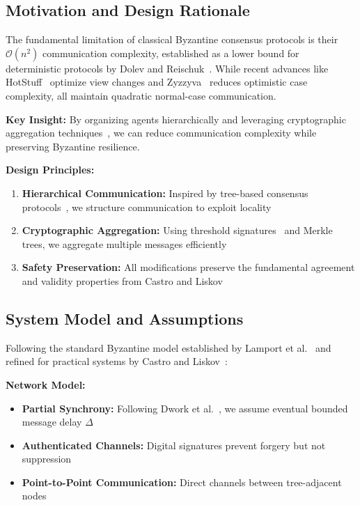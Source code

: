 \documentclass[conference]{IEEEtran}
\newcommand{\bigO}{\mathcal{O}}
\begin{document}
\subsection{Motivation and Design Rationale}

The fundamental limitation of classical Byzantine consensus protocols is their $\bigO(n^2)$ communication complexity, established as a lower bound for deterministic protocols by Dolev and Reischuk~\cite{dolev1985bounds}. While recent advances like HotStuff~\cite{yin2019hotstuff} optimize view changes and Zyzzyva~\cite{kotla2009zyzzyva} reduces optimistic case complexity, all maintain quadratic normal-case communication.

\textbf{Key Insight:} By organizing agents hierarchically and leveraging cryptographic aggregation techniques~\cite{boneh2001short}, we can reduce communication complexity while preserving Byzantine resilience.

\textbf{Design Principles:}
\begin{enumerate}
    \item \textbf{Hierarchical Communication:} Inspired by tree-based consensus protocols~\cite{bracha1987asynchronous}, we structure communication to exploit locality
    \item \textbf{Cryptographic Aggregation:} Using threshold signatures~\cite{boneh2001short} and Merkle trees, we aggregate multiple messages efficiently
    \item \textbf{Safety Preservation:} All modifications preserve the fundamental agreement and validity properties from Castro and Liskov~\cite{castro1999practical}
\end{enumerate}

\subsection{System Model and Assumptions}

Following the standard Byzantine model established by Lamport et al.~\cite{lamport1982byzantine} and refined for practical systems by Castro and Liskov~\cite{castro1999practical}:

\textbf{Network Model:}
\begin{itemize}
    \item \textbf{Partial Synchrony:} Following Dwork et al.~\cite{dwork1988consensus}, we assume eventual bounded message delay $\Delta$
    \item \textbf{Authenticated Channels:} Digital signatures prevent forgery but not suppression
    \item \textbf{Point-to-Point Communication:} Direct channels between tree-adjacent nodes
\end{itemize}
\end{document}
